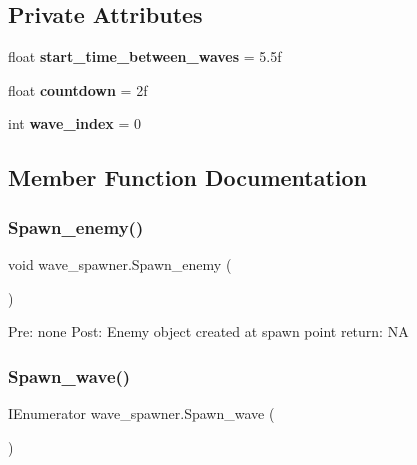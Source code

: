 \subsection*{Private Attributes}
\begin{DoxyCompactItemize}
\item 
\mbox{\label{classwave__spawner_a6f2f5e8ba354225136c8c116508ca207}} 
float {\bfseries start\+\_\+time\+\_\+between\+\_\+waves} = 5.\+5f
\item 
\mbox{\label{classwave__spawner_af3057e46998da1c5bee5cc59f1bf6287}} 
float {\bfseries countdown} = 2f
\item 
\mbox{\label{classwave__spawner_a8befc58cd3205bc2419130ea673bafbc}} 
int {\bfseries wave\+\_\+index} = 0
\end{DoxyCompactItemize}


\subsection{Member Function Documentation}
\mbox{\label{classwave__spawner_a21e2893023c0716bee2f0811eaee7fa2}} 
\subsubsection{\texorpdfstring{Spawn\+\_\+enemy()}{Spawn\_enemy()}}
{\footnotesize\ttfamily void wave\+\_\+spawner.\+Spawn\+\_\+enemy (\begin{DoxyParamCaption}{ }\end{DoxyParamCaption})\hspace{0.3cm}{\ttfamily [private]}}

Pre\+: none Post\+: Enemy object created at spawn point return\+: NA \mbox{\label{classwave__spawner_ad77dc8cd1dbf901d7be2336b5768829e}} 
\subsubsection{\texorpdfstring{Spawn\+\_\+wave()}{Spawn\_wave()}}
{\footnotesize\ttfamily I\+Enumerator wave\+\_\+spawner.\+Spawn\+\_\+wave (\begin{DoxyParamCaption}{ }\end{DoxyParamCaption})\hspace{0.3cm}{\ttfamily [private]}}

